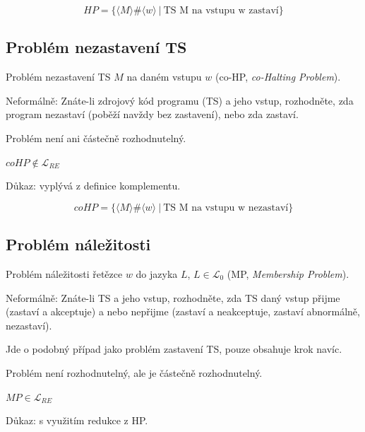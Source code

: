 $$ HP = \{ \langle M \rangle \# \langle w \rangle ~|~ \text{TS M na vstupu w zastaví} \} $$

\subsection*{Problém nezastavení TS}

\begin{compactitem}
    \item Problém nezastavení TS $M$ na daném vstupu $w$ (co-HP, \textit{co-Halting Problem}).

    \item Neformálně: Znáte-li zdrojový kód programu (TS) a jeho vstup, rozhodněte, zda program nezastaví (poběží navždy bez zastavení), nebo zda zastaví.

    \item Problém není ani částečně rozhodnutelný. \begin{compactitem}
        \item $coHP \not\in \mathcal{L}_{RE}$
        \item Důkaz: vyplývá z definice komplementu.
    \end{compactitem}
\end{compactitem}

$$ coHP = \{ \langle M \rangle \# \langle w \rangle ~|~ \text{TS M na vstupu w nezastaví} \} $$

\subsection*{Problém náležitosti}

\begin{compactitem}
    \item Problém náležitosti řetězce $w$ do jazyka $L$, $L \in \mathcal{L}_0$ (MP, \textit{Membership Problem}).

    \item Neformálně: Znáte-li TS a jeho vstup, rozhodněte, zda TS daný vstup přijme (zastaví a akceptuje) a nebo nepřijme (zastaví a neakceptuje, zastaví abnormálně, nezastaví). \begin{compactitem}
        \item Jde o podobný případ jako problém zastavení TS, pouze obsahuje krok navíc.
    \end{compactitem}

    \item Problém není rozhodnutelný, ale je částečně rozhodnutelný. \begin{compactitem}
        \item $MP \in \mathcal{L}_{RE}$
        \item Důkaz: s využitím redukce z HP.
    \end{compactitem}
\end{compactitem}

